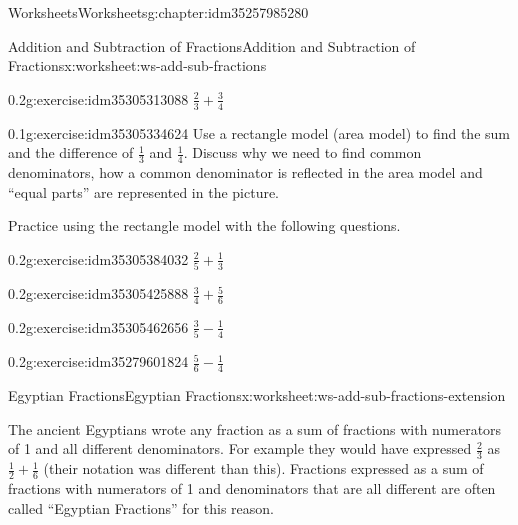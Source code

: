 \documentclass[twoside,11pt,]{book}
\begin{document}
\begin{chapterptx}{Worksheets}{}{Worksheets}{}{}{g:chapter:idm35257985280}
\begin{worksheet-section-numberless}{Addition and Subtraction of Fractions}{}{Addition and Subtraction of Fractions}{}{}{x:worksheet:ws-add-sub-fractions}
\begin{divisionexercise}{3}{}{0.2}{g:exercise:idm35305313088}%
\(\frac{2}{3} + \frac{3}{4} \)%
\end{divisionexercise}%
\clearpage
\begin{divisionexercise}{4}{}{0.1}{g:exercise:idm35305334624}%
Use a rectangle model (area model) to find the sum and the difference of \(\frac{1}{3} \) and \(\frac{1}{4} \).  Discuss why we need to find common denominators, how a common denominator is reflected in the area model and “equal parts” are represented in the picture.%
\end{divisionexercise}%
\begin{introduction}{}%
Practice using the rectangle model with the following questions.%
\end{introduction}%
\begin{divisionexercise}{5}{}{0.2}{g:exercise:idm35305384032}%
\(\frac{2}{5} + \frac{1}{3} \)%
\end{divisionexercise}%
\begin{divisionexercise}{6}{}{0.2}{g:exercise:idm35305425888}%
\(\frac{3}{4} + \frac{5}{6} \)%
\end{divisionexercise}%
\begin{divisionexercise}{7}{}{0.2}{g:exercise:idm35305462656}%
\(\frac{3}{5} - \frac{1}{4}  \)%
\end{divisionexercise}%
\begin{divisionexercise}{8}{}{0.2}{g:exercise:idm35279601824}%
\(\frac{5}{6} - \frac{1}{4} \)%
\end{divisionexercise}%
\end{worksheet-section-numberless}
\restoregeometry
%
%
\typeout{************************************************}
\typeout{************************************************}
%
\begin{worksheet-section-numberless}{Egyptian Fractions}{}{Egyptian Fractions}{}{}{x:worksheet:ws-add-sub-fractions-extension}
\begin{introduction}{}%
The ancient Egyptians wrote any fraction as a sum of fractions with numerators of 1 and all different denominators.  For example they would have expressed \(\frac{2}{3} \) as \(\frac{1}{2} + \frac{1}{6} \) (their notation was different than this).  Fractions expressed as a sum of fractions with numerators of 1 and denominators that are all different are often called “Egyptian Fractions” for this reason.%
\par

\end{introduction}
\end{worksheet-section-numberless}
\end{chapterptx}
\end{document}
